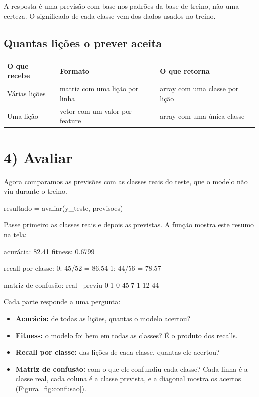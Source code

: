\documentclass[11pt,a4paper]{article}
\newenvironment{tabela}{\par\nopagebreak[4]\vspace{0.3em}\nopagebreak[4]\begingroup\centering\small}{\par\endgroup\vspace{0.6em}}
\begin{document}
A resposta é uma previsão com base nos padrões da base de treino, não uma certeza. O significado de cada classe vem dos dados usados no treino.

\subsection{Quantas lições o prever aceita}

\begin{tabela}
\begin{tabular}{lll}
\toprule
O que recebe & Formato & O que retorna\\
\midrule
Várias lições & matriz com uma lição por linha & array com uma classe por lição\\
Uma lição & vetor com um valor por feature & array com uma única classe\\
\bottomrule
\end{tabular}
\end{tabela}

\clearpage
\section{4) Avaliar}

Agora comparamos as previsões com as classes reais do teste, que o modelo não viu durante o treino.

\begin{py}
resultado = avaliar(y_teste, previsoes)
\end{py}

Passe primeiro as classes reais e depois as previstas. A função mostra este resumo na tela:

\begin{saida}
acurácia: 82.41%
fitness: 0.6799

recall por classe:
  0: 45/52 = 86.54%
  1: 44/56 = 78.57%

matriz de confusão:
real \ previu   0   1
            0  45   7
            1  12  44
\end{saida}

Cada parte responde a uma pergunta:

\begin{itemize}
  \item \textbf{Acurácia:} de todas as lições, quantas o modelo acertou?
  \item \textbf{Fitness:} o modelo foi bem em todas as classes? É o produto dos recalls.
  \item \textbf{Recall por classe:} das lições de cada classe, quantas ele acertou?
  \item \textbf{Matriz de confusão:} com o que ele confundiu cada classe? Cada linha é a classe real, cada coluna é a classe prevista, e a diagonal mostra os acertos (Figura~\ref{fig:confusao}).
\end{itemize}
\end{document}
